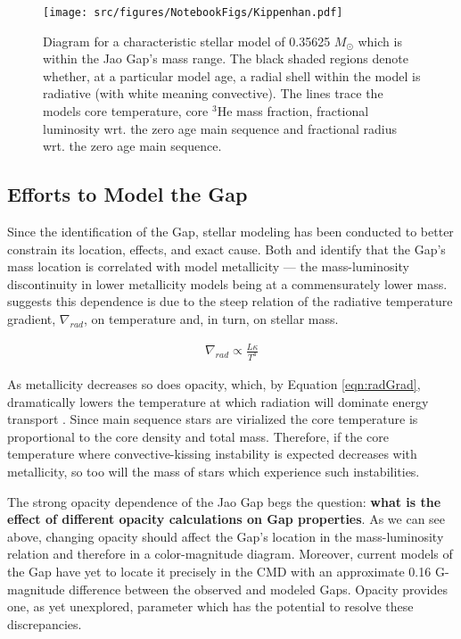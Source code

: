 \begin{figure*}
	\centering
	\texttt{[image: src/figures/NotebookFigs/Kippenhan.pdf]}
	\caption{Diagram for a characteristic stellar model of 0.35625 $M_{\odot}$
	which is within the Jao Gap's mass range. The black shaded regions denote
	whether, at a particular model age, a radial shell within the model is
	radiative (with white meaning convective). The lines trace the models core
	temperature, core $^{3}$He mass fraction, fractional luminosity wrt. the
	zero age main sequence and fractional radius wrt. the zero age main
	sequence.}
	\label{fig:Kippenhan1}
\end{figure*}


\subsection{Efforts to Model the Gap}
Since the identification of the Gap, stellar modeling has been
conducted to better constrain its location, effects, and exact cause.
Both \citet{Mansfield2021} and \citet{Feiden2021} identify that the Gap's mass
location is correlated with model metallicity --- the mass-luminosity
discontinuity in lower metallicity models being at a commensurately lower mass.
\citet{Feiden2021} suggests this dependence is due to the steep relation of
the radiative temperature gradient, $\nabla_{rad}$, on temperature and, in turn,
on stellar mass.

\begin{align}\label{eqn:radGrad}
	\nabla_{rad} \propto \frac{L\kappa}{T^{4}}
\end{align}

As metallicity decreases so does opacity, which, by Equation \ref{eqn:radGrad},
dramatically lowers the temperature at which radiation will dominate energy
transport \citep{Chabrier1997}. Since main sequence stars are virialized the
core temperature is proportional to the core density and total mass. Therefore,
if the core temperature where convective-kissing instability is expected
decreases with metallicity, so too will the mass of stars which experience such
instabilities.


The strong opacity dependence of the Jao Gap begs the question: \textbf{what is
the effect of different opacity calculations on Gap properties}.
As we can see above, changing opacity should affect the Gap's location in the
mass-luminosity relation and therefore in a color-magnitude diagram. Moreover,
current models of the Gap have yet to locate it precisely in the CMD
\citep{Feiden2021} with an approximate 0.16 G-magnitude difference between the
observed and modeled Gaps. Opacity provides one, as yet unexplored, parameter
which has the potential to resolve these discrepancies.

